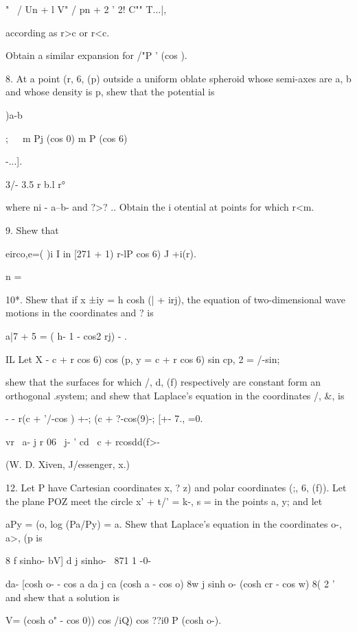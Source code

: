 "~ / Un + l V" / pn + 2 ' 2! C"" T...|,

according as r>c or r<c.

Obtain a similar expansion for /"P ' (cos ). 

8. At a point (r, 6, (p) outside a uniform oblate spheroid whose
semi-axes are a, b and whose density is p, shew that the potential is

)a-b

;\ \ \ m Pj (cos 0) m P (cos 6)

-...].

3/- 3.5 r b.l r°

where ni - a--b- and ?>? .. Obtain the i otential at points for which
r<m.


%
%

9. Shew that

eirco,e=( )i I in [271 + 1) r-lP cos 6) J +i(r).

n =


10*. Shew that if x ±iy = h cosh (| + irj), the equation of
two-dimensional wave motions in the coordinates and ? is

a|7 + 5 = ( h- 1 - cos2 rj) - . 

IL Let X - c + r cos 6) cos (p, y = c + r cos 6) sin cp, 2 = /-sin;

shew that the surfaces for which /, d, (f) respectively are constant
form an orthogonal .system; and shew that Laplace's equation in the
coordinates /, \&, is

- - r(c + '/-cos ) +-; (c + ?-cos(9)-; [+- 7., =0.

vr \ a- j r 06 \ j- ' cd \ c + rcosdd(f>-

(W. D. Xiven, J/essenger, x.)

12. Let P have Cartesian coordinates x, ? z) and polar coordinates
(;, 6, (f)). Let the plane POZ meet the circle x' + t/' = k-, s = in
the points a, y; and let

aPy = (o, log (Pa/Py) = a. Shew that Laplace's equation in the
coordinates o-, a>, (p is

8 f sinho- bV] d j sinho- \ 871 1 -0-

da- [cosh o- - cos a da j ca (cosh a - cos o) 8w j sinh o- (cosh cr -
cos w) 8( 2 ' and shew that a solution is

V= (cosh o" - cos 0)) cos /iQ) cos ??i0 P (cosh o-).

